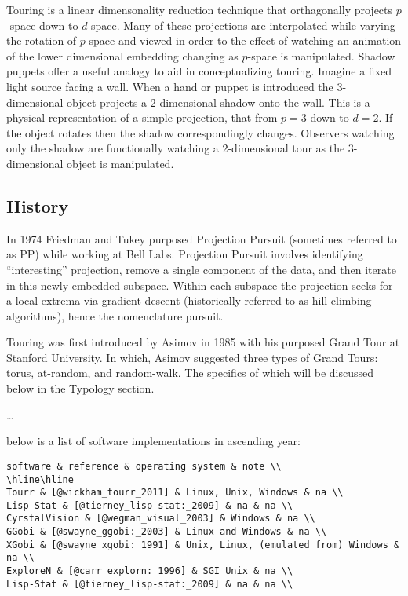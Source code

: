 \documentclass{monashthesis}
\theoremstyle{definition}
\theoremstyle{definition}
\theoremstyle{definition}
\theoremstyle{remark}
\begin{document}
Touring is a linear dimensonality reduction technique that orthagonally
projects \(p\)-space down to \(d\)-space. Many of these projections are
interpolated while varying the rotation of \(p\)-space and viewed in
order to the effect of watching an animation of the lower dimensional
embedding changing as \(p\)-space is manipulated. Shadow puppets offer a
useful analogy to aid in conceptualizing touring. Imagine a fixed light
source facing a wall. When a hand or puppet is introduced the
3-dimensional object projects a 2-dimensional shadow onto the wall. This
is a physical representation of a simple projection, that from \(p=3\)
down to \(d=2\). If the object rotates then the shadow correspondingly
changes. Observers watching only the shadow are functionally watching a
2-dimensional tour as the 3-dimensional object is manipulated.

\subsection{History}\label{history}

In 1974 Friedman and Tukey purposed Projection
Pursuit\autocite{friedman_projection_1974} (sometimes referred to as PP)
while working at Bell Labs. Projection Pursuit involves identifying
``interesting'' projection, remove a single component of the data, and
then iterate in this newly embedded subspace. Within each subspace the
projection seeks for a local extrema via gradient descent (historically
referred to as hill climbing algorithms), hence the nomenclature
pursuit.

Touring was first introduced by Asimov in 1985 with his purposed Grand
Tour\autocite{asimov_grand_1985} at Stanford University. In which,
Asimov suggested three types of Grand Tours: torus, at-random, and
random-walk. The specifics of which will be discussed below in the
Typology section.

\ldots{}

below is a list of software implementations in ascending year:

\begin{verbatim}
software & reference & operating system & note \\
\hline\hline
Tourr & [@wickham_tourr_2011] & Linux, Unix, Windows & na \\
Lisp-Stat & [@tierney_lisp-stat:_2009] & na & na \\
CyrstalVision & [@wegman_visual_2003] & Windows & na \\
GGobi & [@swayne_ggobi:_2003] & Linux and Windows & na \\
XGobi & [@swayne_xgobi:_1991] & Unix, Linux, (emulated from) Windows & na \\
ExploreN & [@carr_explorn:_1996] & SGI Unix & na \\
Lisp-Stat & [@tierney_lisp-stat:_2009] & na & na \\
\end{verbatim}
\end{document}
